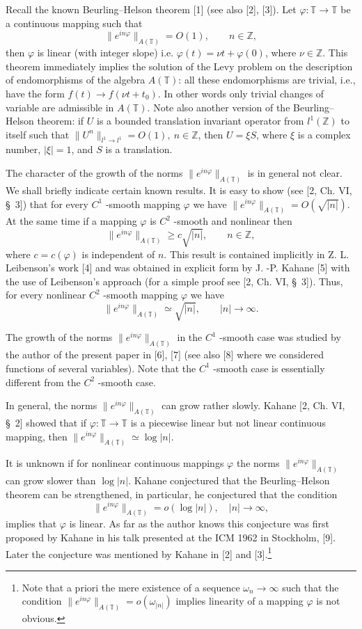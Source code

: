\documentclass[12pt]{article}
\begin{document}
  Recall the known Beurling--Helson theorem
[1] (see also [2], [3]). Let $\varphi : \mathbb
T\rightarrow\mathbb T$ be a continuous mapping such that
$$
\|e^{in\varphi}\|_{A(\mathbb T)}=O(1),
\qquad n\in\mathbb Z,
$$
then $\varphi$ is linear (with integer slope) i.e. $\varphi(t)=\nu
t+\varphi(0)$, where $\nu\in\mathbb Z$. This theorem immediately
implies the solution of the Levy problem on the description of
endomorphisms of the algebra $A(\mathbb T)$: all these
endomorphisms are trivial, i.e., have the form $f(t)\rightarrow
f(\nu t+t_0)$. In other words only trivial changes of variable are
admissible in $A(\mathbb T)$. Note also another version of the
Beurling--Helson theorem: if $U$ is a bounded translation
invariant operator from $l^1(\mathbb Z)$ to itself such that
$\|U^n\|_{l^1\rightarrow l^1}=O(1), ~n \in \mathbb Z$, then $U=\xi
S$, where $\xi$ is a complex number, $|\xi|=1$, and $S$ is a
translation.

  The character of the growth of the norms
$\|e^{in\varphi}\|_{A(\mathbb T)}$ is in general not clear. We
shall briefly indicate certain known results. It is easy to show
(see [2, Ch. VI, \S~3]) that for every $C^1$ -smooth mapping
$\varphi$ we have $\|e^{in\varphi}\|_{A(\mathbb
T)}=O(\sqrt{|n|})$. At the same time if a mapping $\varphi$ is
$C^2$ -smooth and nonlinear then
$$
\|e^{in\varphi}\|_{A(\mathbb T)}\geq c\sqrt{|n|},
\qquad n\in\mathbb Z,
$$
where $c=c(\varphi)$ is independent of $n$. This result is
contained implicitly in Z. L. Leibenson's work [4] and was
obtained in explicit form by J. -P. Kahane [5] with the use of
Leibenson's approach (for a simple proof see [2, Ch. VI, \S~3]).
Thus, for every nonlinear $C^2$ -smooth mapping $\varphi$ we have
$$
\|e^{in\varphi}\|_{A(\mathbb T)}\simeq\sqrt{|n|},
\qquad |n|\rightarrow\infty.
$$

  The growth of the norms $\|e^{in\varphi}\|_{A(\mathbb T)}$ in
the  $C^1$ -smooth case was studied by the author of the present
paper in [6], [7] (see also [8] where we considered functions of
several variables). Note that the $C^1$ -smooth case is
essentially different from the $C^2$ -smooth case.

  In general, the norms $\|e^{in\varphi}\|_{A(\mathbb T)}$ can
grow rather slowly. Kahane [2, Ch. VI, \S~2] showed that if
$\varphi: \mathbb T\rightarrow\mathbb T$ is a piecewise linear but
not linear continuous mapping, then $\|e^{in\varphi}\|_{A(\mathbb
T)}\simeq \log |n|$.

   It is unknown if for nonlinear continuous mappings
$\varphi$ the norms $\|e^{in\varphi}\|_{A(\mathbb T)}$ can grow
slower than $\log |n|$. Kahane conjectured that the
Beurling--Helson theorem can be strengthened, in particular, he
conjectured that the condition
$$
\|e^{in\varphi}\|_{A(\mathbb T)}=o(\log
|n|), \quad |n|\rightarrow\infty,
$$
implies that $\varphi$ is linear. As far as the author knows this
conjecture was first proposed by Kahane in his talk presented at
the ICM 1962 in Stockholm, [9]. Later the conjecture was mentioned
by Kahane in [2] and [3].\footnote{Note that a priori the mere
existence of a sequence $\omega_n\rightarrow\infty$ such that the
condition $\|e^{in\varphi}\|_{A(\mathbb T)}=o(\omega_{|n|})$
implies linearity of a mapping $\varphi$ is not obvious.}
\end{document}
